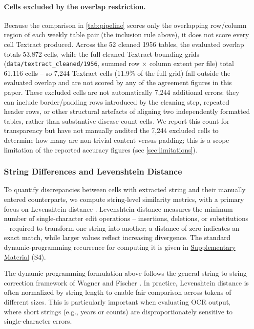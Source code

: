 \documentclass[12pt]{article}
\begin{document}
\paragraph{Cells excluded by the overlap restriction.} Because the comparison in \cref{tab:pipeline} scores only the overlapping row/column region of each weekly table pair (the inclusion rule above), it does not score every cell Textract produced. Across the 52 cleaned 1956 tables, the evaluated overlap totals 53{,}872 cells, while the full cleaned Textract bounding grids (\texttt{data/textract\_cleaned/1956}, summed row $\times$ column extent per file) total 61{,}116 cells -- so 7{,}244 Textract cells (11.9\% of the full grid) fall outside the evaluated overlap and are not scored by any of the agreement figures in this paper. These excluded cells are not automatically 7{,}244 additional errors: they can include border/padding rows introduced by the cleaning step, repeated header rows, or other structural artefacts of aligning two independently formatted tables, rather than substantive disease-count cells. We report this count for transparency but have not manually audited the 7{,}244 excluded cells to determine how many are non-trivial content versus padding; this is a scope limitation of the reported accuracy figures (see \cref{sec:limitations}).

\subsubsection{String Differences and Levenshtein Distance} \label{sec:levdist}
To quantify discrepancies between cells with extracted string and their manually entered counterparts, we compute string-level similarity metrics, with a primary focus on Levenshtein distance \cite{Levenshtein1965BinaryCC}. Levenshtein distance measures the minimum number of single-character edit operations -- insertions, deletions, or substitutions -- required to transform one string into another; a distance of zero indicates an exact match, while larger values reflect increasing divergence. The standard dynamic-programming recurrence for computing it is given in \hyperref[sec:supp]{Supplementary Material} (S4).

The dynamic-programming formulation above follows the general string-to-string correction framework of Wagner and Fischer \cite{wagner1974string}. In practice, Levenshtein distance is often normalized by string length to enable fair comparison across tokens of different sizes. This is particularly important when evaluating OCR output, where short strings (e.g., years or counts) are disproportionately sensitive to single-character errors.
\end{document}
